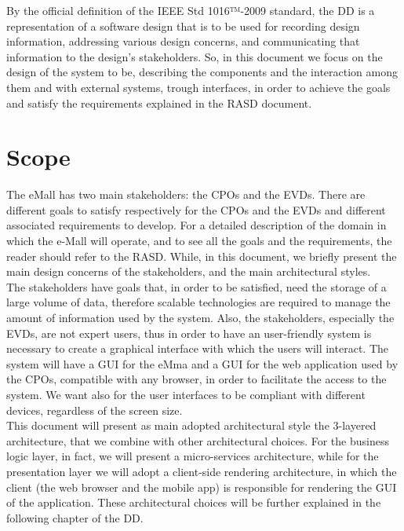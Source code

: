 By the official definition of the IEEE Std 1016™-2009 standard, the DD is a representation of a software design that is to be used for recording design information, addressing various design concerns, and communicating that information to the design’s stakeholders. So, in this document we focus on the design of the system to be, describing the components and the interaction among them and with external systems, trough interfaces, in order to achieve the goals and satisfy the requirements explained in the RASD document. 

\section{Scope}
\label{sec:Scope}%
The eMall has two main stakeholders: the CPOs and the EVDs. There are different goals to satisfy respectively for the CPOs and the EVDs and different associated requirements to develop. For a detailed description of the domain in which the e-Mall will operate, and to see all the goals and the requirements, the reader should refer to the RASD. While, in this document, we briefly present the main design concerns of the stakeholders, and the main architectural styles. \\

The stakeholders have goals that, in order to be satisfied, need the storage of a large volume of data, therefore scalable technologies are required to manage the amount of information used by the system.
Also, the stakeholders, especially the EVDs, are not expert users, thus in order to have an user-friendly system is necessary to create a graphical interface with which the users will interact. The system will have a GUI for the eMma and a GUI for the web application used by the CPOs, compatible with any browser, in order to facilitate the access to the system. We want also for the user interfaces to be compliant with different devices, regardless of the screen size.\\

This document will present as main adopted architectural style the 3-layered architecture, that we combine with other architectural choices. For the business logic layer, in fact, we will present a micro-services architecture, while for the presentation layer we will adopt a client-side rendering architecture, in which the client (the web browser and the mobile app) is responsible for rendering the GUI of the application. These architectural choices will be further explained in the following chapter of the DD.

